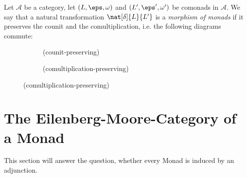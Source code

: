 \begin{definition}
    Let $\mathcal{A}$ be a category, let $(L,\eps,\omega)$ and $(L',\eps',\omega')$ be comonads in $\mathcal{A}$.
    We say that a natural transformation $\nat[\delta]{L}{L'}$ is a \textit{morphism of monads} if it preserves
    the counit and the comultiplication, i.e. the following diagrams commute:
    \begin{figure}[H]
    \centering
    \begin{subfigure}{0.4\textwidth}
    \centering
    \caption*{(counit-preserving)}
    \end{subfigure}
    \hspace{2em}
    \begin{subfigure}{0.4\textwidth}
    \centering
    \caption*{(comultiplication-preserving)}
    \end{subfigure}
    \end{figure}
\end{definition}

\section{The Eilenberg-Moore-Category of a Monad}
This section will answer the question, whether every Monad is induced by an adjunction.

